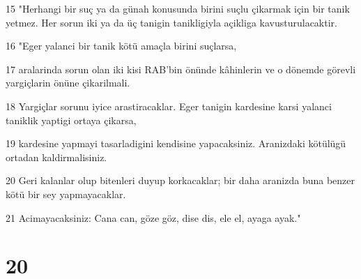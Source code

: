 \par 15 "Herhangi bir suç ya da günah konusunda birini suçlu çikarmak için bir tanik yetmez. Her sorun iki ya da üç tanigin tanikligiyla açikliga kavusturulacaktir.
\par 16 "Eger yalanci bir tanik kötü amaçla birini suçlarsa,
\par 17 aralarinda sorun olan iki kisi RAB'bin önünde kâhinlerin ve o dönemde görevli yargiçlarin önüne çikarilmali.
\par 18 Yargiçlar sorunu iyice arastiracaklar. Eger tanigin kardesine karsi yalanci taniklik yaptigi ortaya çikarsa,
\par 19 kardesine yapmayi tasarladigini kendisine yapacaksiniz. Aranizdaki kötülügü ortadan kaldirmalisiniz.
\par 20 Geri kalanlar olup bitenleri duyup korkacaklar; bir daha aranizda buna benzer kötü bir sey yapmayacaklar.
\par 21 Acimayacaksiniz: Cana can, göze göz, dise dis, ele el, ayaga ayak."

\chapter{20}

